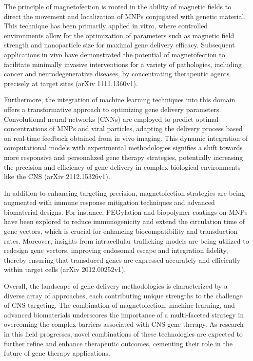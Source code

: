 \documentclass{article}
\begin{document}
The principle of magnetofection is rooted in the ability of magnetic fields to direct the movement and localization of MNPs conjugated with genetic material. This technique has been primarily applied in vitro, where controlled environments allow for the optimization of parameters such as magnetic field strength and nanoparticle size for maximal gene delivery efficacy. Subsequent applications in vivo have demonstrated the potential of magnetofection to facilitate minimally invasive interventions for a variety of pathologies, including cancer and neurodegenerative diseases, by concentrating therapeutic agents precisely at target sites (arXiv 1111.1360v1).

Furthermore, the integration of machine learning techniques into this domain offers a transformative approach to optimizing gene delivery parameters. Convolutional neural networks (CNNs) are employed to predict optimal concentrations of MNPs and viral particles, adapting the delivery process based on real-time feedback obtained from in vivo imaging. This dynamic integration of computational models with experimental methodologies signifies a shift towards more responsive and personalized gene therapy strategies, potentially increasing the precision and efficiency of gene delivery in complex biological environments like the CNS (arXiv 2112.15326v1).

In addition to enhancing targeting precision, magnetofection strategies are being augmented with immune response mitigation techniques and advanced biomaterial designs. For instance, PEGylation and biopolymer coatings on MNPs have been explored to reduce immunogenicity and extend the circulation time of gene vectors, which is crucial for enhancing biocompatibility and transduction rates. Moreover, insights from intracellular trafficking models are being utilized to redesign gene vectors, improving endosomal escape and integration fidelity, thereby ensuring that transduced genes are expressed accurately and efficiently within target cells (arXiv 2012.00252v1).

Overall, the landscape of gene delivery methodologies is characterized by a diverse array of approaches, each contributing unique strengths to the challenge of CNS targeting. The combination of magnetofection, machine learning, and advanced biomaterials underscores the importance of a multi-faceted strategy in overcoming the complex barriers associated with CNS gene therapy. As research in this field progresses, novel combinations of these technologies are expected to further refine and enhance therapeutic outcomes, cementing their role in the future of gene therapy applications.
\end{document}
